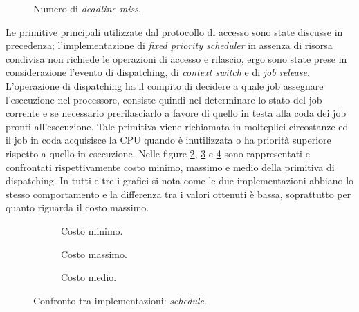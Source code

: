 {  \begin{figure}
    \graficoUno
    \caption{Numero di \textit{deadline miss}.} %
    \label{fig:DLM}
  \end{figure}

\noindent Le primitive principali utilizzate dal protocollo di accesso sono state discusse in precedenza; l'implementazione di \textit{fixed priority scheduler} in assenza di risorsa condivisa non richiede le operazioni di accesso e rilascio, ergo sono state prese in considerazione l'evento di dispatching, di \textit{context switch} e di \textit{job release}.\\

\noindent L'operazione di dispatching ha il compito di decidere a quale job assegnare l'esecuzione nel processore, consiste quindi nel determinare lo stato del job corrente e se necessario prerilasciarlo a favore di quello in testa alla coda dei job pronti all'esecuzione. Tale primitiva viene richiamata in molteplici circostanze ed il job in coda acquisisce la CPU quando è inutilizzata o ha priorità superiore rispetto a quello in esecuzione. Nelle figure \ref{fig:schedMin}, \ref{fig:schedMax} e \ref{fig:schedAvg} sono rappresentati e confrontati rispettivamente costo minimo, massimo e medio della primitiva di dispatching. In tutti e tre i grafici si nota come le due implementazioni abbiano lo stesso comportamento e la differenza tra i valori ottenuti è bassa, soprattutto per quanto riguarda il costo massimo.\\

  \begin{figure}[htb]
    \centering
      \begin{subfigure}[b]{0.49\textwidth}
        \centering
        \resizebox{\linewidth}{!}\graficoSchedMIN  
        \caption{Costo minimo.}
        \label{fig:schedMin}
      \end{subfigure}
      \begin{subfigure}[b]{0.49\textwidth}
        \centering
        \resizebox{\linewidth}{!}\graficoSchedMAX
        \caption{Costo massimo.}
        \label{fig:schedMax}
      \end{subfigure}
      \begin{subfigure}[b]{0.49\textwidth}
        \centering
        \resizebox{\linewidth}{!}\graficoSchedAVG
        \caption{Costo medio.}
        \label{fig:schedAvg}
      \end{subfigure}

    \caption{Confronto tra implementazioni: \textit{schedule}.}
    \label{fig:sched}
  \end{figure}

}
